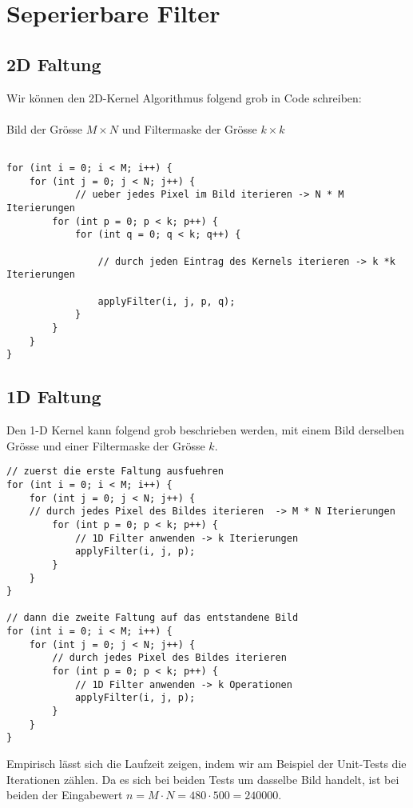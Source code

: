 \documentclass{article} %
\begin{document}
\section{Seperierbare Filter}
\subsection{2D Faltung}

Wir können den 2D-Kernel Algorithmus folgend grob in Code schreiben:\\ \\
Bild der Grösse $M \times N$ und Filtermaske der Grösse $k \times k$

\begin{lstlisting}

for (int i = 0; i < M; i++) {																					
	for (int j = 0; j < N; j++) {																			
			// ueber jedes Pixel im Bild iterieren -> N * M Iterierungen
		for (int p = 0; p < k; p++) {																			
			for (int q = 0; q < k; q++) {	
											
				// durch jeden Eintrag des Kernels iterieren -> k *k Iterierungen
								
				applyFilter(i, j, p, q);
			}
		}
	}
}
\end{lstlisting}

\subsection{1D Faltung}

Den 1-D Kernel kann folgend grob beschrieben werden, mit einem Bild derselben Grösse und einer Filtermaske der Grösse $k$.

\begin{lstlisting}
// zuerst die erste Faltung ausfuehren
for (int i = 0; i < M; i++) {													
	for (int j = 0; j < N; j++) {												
	// durch jedes Pixel des Bildes iterieren  -> M * N Iterierungen
		for (int p = 0; p < k; p++) {											
			// 1D Filter anwenden -> k Iterierungen
			applyFilter(i, j, p);
		}
	}
}

// dann die zweite Faltung auf das entstandene Bild
for (int i = 0; i < M; i++) {												
	for (int j = 0; j < N; j++) {												
		// durch jedes Pixel des Bildes iterieren
		for (int p = 0; p < k; p++) {											
			// 1D Filter anwenden -> k Operationen
			applyFilter(i, j, p);
		}
	}
}
\end{lstlisting}
Empirisch lässt sich die Laufzeit zeigen, indem wir am Beispiel der Unit-Tests die Iterationen zählen. Da es sich bei beiden Tests um dasselbe Bild handelt, ist bei beiden der Eingabewert $n = M \cdot N = 480 \cdot 500 = 240000$.
\end{document}
